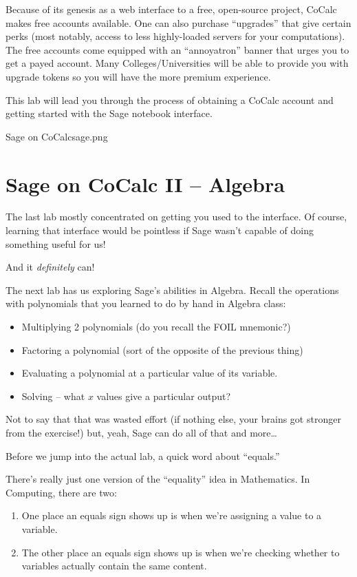 Because of its genesis as a web interface to a free, open-source project, CoCalc makes free accounts available.  One can also purchase ``upgrades'' that give certain perks (most notably, access to less highly-loaded servers for your computations).  The free accounts come equipped with an ``annoyatron'' banner that urges you to get a payed account.  Many Colleges/Universities will be able to provide you with upgrade tokens so you will have the more premium experience.


This lab will lead you through the process of obtaining a CoCalc account and getting started with the Sage notebook interface.

\clearpage
\begin{worksheet}{7}{Sage on CoCalc}{sage.png}

\end{worksheet}
\clearpage

\section{Sage on CoCalc II -- Algebra}

The last lab mostly concentrated on getting you used to the interface. Of course, learning that interface would be pointless if Sage wasn't capable of doing something useful for us!

And it {\em definitely} can!

The next lab has us exploring Sage's abilities in Algebra.  Recall the operations with polynomials that you learned to do by hand in Algebra class:

\begin{itemize}
	\item Multiplying 2 polynomials (do you recall the FOIL mnemonic?)
	\item Factoring a polynomial (sort of the opposite of the previous thing)
	\item Evaluating a polynomial at a particular value of its variable.
	\item Solving -- what $x$ values give a particular output?
\end{itemize}

Not to say that that was wasted effort (if nothing else, your brains got stronger from the exercise!)
but, yeah, Sage can do all of that and more\dots

Before we jump into the actual lab, a quick word about ``equals.''

There's really just one version of the ``equality'' idea in Mathematics.  In Computing, there are two:
\begin{enumerate}
	\item One place an equals sign shows up is when we're assigning a value to a variable.
	\item The other place an equals sign shows up is when we're checking whether to variables actually contain the same content.
\end{enumerate}

